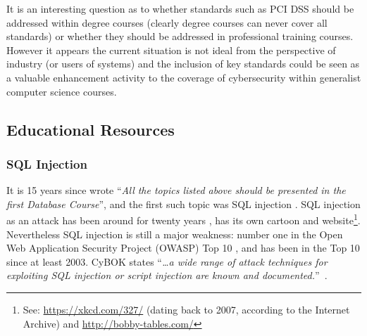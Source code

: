 \documentclass[conference]{IEEEtran}
\begin{document}
It is an interesting question as to whether standards such as PCI DSS should be addressed within degree courses (clearly degree courses can never cover all standards) or whether they should be addressed in professional training courses. However it appears the current situation is not ideal from the perspective of industry (or users of systems) and the inclusion of key standards could be seen as a valuable enhancement activity to the coverage of cybersecurity within generalist computer science courses.

\subsection{Educational Resources}\label{sec:EDResource}

\subsubsection{SQL Injection}\label{sec:SQL}

It is 15 years since \cite{Guimaraesetal2004} wrote ``{\emph{All the topics listed above should be presented in the first Database Course}}'', and the first such topic was SQL injection \cite{SPIDynamics2002,Anonymous2018b}. SQL injection as an attack has been around for twenty years \cite{HornerHyslip2017a}, has its own cartoon and website\footnote{See: \url{https://xkcd.com/327/} (dating back to 2007, according to the Internet Archive) and \url{http://bobby-tables.com/}}. Nevertheless SQL injection is still a major weakness: number one in the Open Web Application Security Project (OWASP) Top 10 \cite{OWASP2017a}, and has been in the Top 10 since at least 2003. CyBOK states ``{\emph{\ldots a wide range of attack techniques for exploiting SQL injection or script injection are known and documented.}}''~\cite{Bristol2018a}.
\end{document}
